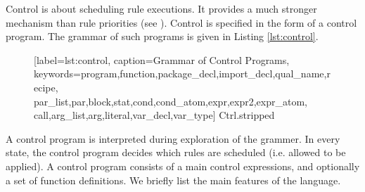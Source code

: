 Control is about scheduling rule executions. It provides a much stronger
mechanism than rule priorities (see ).  Control is
specified in the form of a control program. The grammar of such programs is
given in Listing \ref{lst:control}.

\lstset{
	basicstyle=\ttfamily\scriptsize
}

\begin{figure}
%
  [label=lst:control,%
   caption={Grammar of Control Programs},%
   keywords={program,function,package_decl,import_decl,qual_name,recipe,%
             par_list,par,block,stat,cond,cond_atom,expr,expr2,expr_atom,
             call,arg_list,arg,literal,var_decl,var_type}]%
  {Ctrl.stripped}
\end{figure}

A control program is interpreted during exploration of the grammer. In every
state, the control program decides which rules are scheduled (i.e. allowed to
be applied). A control program consists of a main control expressions, and
optionally a set of function definitions. We briefly list the main features of
the language.
%
